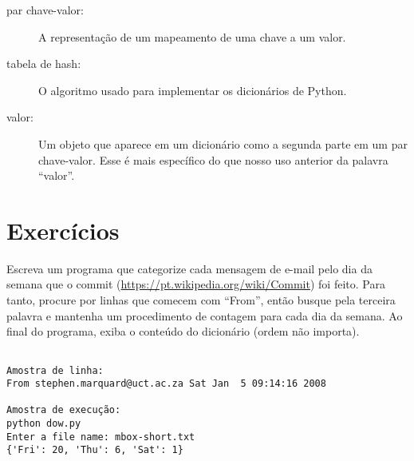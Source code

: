 \begin{description}
\item[par chave-valor:] A representação de um mapeamento de uma chave a um valor.

\item[tabela de hash:] O algoritmo usado para implementar os dicionários de Python.

\item[valor:] Um objeto que aparece em um dicionário como a segunda parte em um par chave-valor. Esse é mais específico do que nosso uso anterior da palavra ``valor''.

\end{description}

\section{Exercícios}

\begin{ex}

Escreva um programa que categorize cada mensagem de e-mail pelo dia da semana que o commit (\url{https://pt.wikipedia.org/wiki/Commit}) foi feito. Para tanto, procure por linhas que comecem com ``From'', então busque pela terceira palavra e mantenha um procedimento de contagem para cada dia da semana. Ao final do programa, exiba o conteúdo do dicionário (ordem não importa).

\beforeverb
\begin{verbatim}

Amostra de linha:
From stephen.marquard@uct.ac.za Sat Jan  5 09:14:16 2008

Amostra de execução:
python dow.py
Enter a file name: mbox-short.txt
{'Fri': 20, 'Thu': 6, 'Sat': 1}
\end{verbatim}
\afterverb
%
%
\end{ex}

